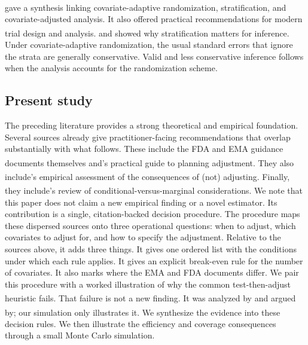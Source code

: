 \documentclass[
  11pt,
]{article}
\begin{document}
\textsuperscript{} gave a synthesis linking
covariate-adaptive randomization, stratification, and
covariate-adjusted analysis. It also offered practical
recommendations for modern trial design and analysis.\textsuperscript{} and\textsuperscript{} showed why
stratification matters for inference. Under
covariate-adaptive randomization, the usual standard
errors that ignore the strata are generally
conservative. Valid and less conservative inference
follows when the analysis accounts for the
randomization scheme.

\subsection{Present study}\label{present-study}

The preceding literature provides a strong theoretical
and empirical foundation. Several sources already give
practitioner-facing recommendations that overlap
substantially with what follows. These include the FDA
and EMA guidance documents themselves and\textsuperscript{}'s practical guide to planning
adjustment. They also include\textsuperscript{}'s
empirical assessment of the consequences of (not)
adjusting. Finally, they include\textsuperscript{}'s review of
conditional-versus-marginal considerations. We note
that this paper does not claim a new empirical finding
or a novel estimator. Its contribution is a single,
citation-backed decision procedure. The procedure maps
these dispersed sources onto three operational
questions: when to adjust, which covariates to adjust
for, and how to specify the adjustment. Relative to the
sources above, it adds three things. It gives one
ordered list with the conditions under which each rule
applies. It gives an explicit break-even rule for the
number of covariates. It also marks where the EMA and
FDA documents differ. We pair this procedure with a
worked illustration of why the common test-then-adjust
heuristic fails. That failure is not a new finding. It
was analyzed by\textsuperscript{} and argued by\textsuperscript{}; our simulation only
illustrates it. We synthesize the
evidence into these decision rules. We then illustrate
the efficiency and coverage consequences through a
small Monte Carlo simulation.
\end{document}
